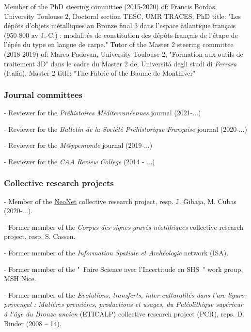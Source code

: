 \documentclass{article}
\begin{document}
Member of the PhD steering committee (2015-2020) of: Francis Bordas, University Toulouse 2, Doctoral section TESC, UMR TRACES, PhD title: "Les d\'{e}p\^{o}ts d'objets m\'{e}talliques au Bronze final 3 dans l'espace atlantique fran\c{c}ais (950-800 av J.-C.) : modalit\'{e}s de constitution des d\'{e}p\^{o}ts fran\c{c}ais de l'\'{e}tape de l'\'{e}p\'{e}e du type en langue de carpe."
\smallbreak
Tutor of the Master 2  steering committee (2018-2019) of: Marco Padovan, University Toulouse 2, "Formation aux outils de traitement 3D" dans le cadre du Master 2 de, Universit\'{a} degli studi di \textit{Ferrara} (Italia), Master 2 title: "The Fabric of the Baume de Monthiver"

\subsubsection*{Journal committees}

-  Reviewer for the \textit{Pr\'{e}histoires M\'{e}diterran\'{e}ennes} journal (2021-...)

-  Reviewer for the \textit{Bulletin de la Soci\'{e}t\'{e} Pr\'{e}historique Fran\c{c}aise} journal (2020-...)

-  Reviewer for the \textit{M@ppemonde} journal (2019-...)

-  Reviewer for the \textit{CAA Review College} (2014 - ...)

\subsubsection*{Collective research projects}

-  Member of the \href{https://redneonet.com/}{NeoNet} collective research project, resp. J. Gibaja, M. Cubas (2020-...).

-  Former member of the \textit{Corpus des signes grav\'{e}s n\'{e}olithiques} collective research project, resp. S. Cassen.

-  Former member of the \textit{Information Spatiale et Arch\'{e}ologie} network (ISA). 

-  Former member of the "~Faire Science avec l'Incertitude en SHS~" work group, MSH Nice.

-  Former member of the \textit{Evolutions, transferts, inter-culturalit\'{e}s dans l'arc liguro-proven\c{c}al : Mati\'{e}res premi\'{e}res, productions et usages, du Pal\'{e}olithique sup\'{e}rieur \'{a} l'\^{a}ge du Bronze ancien} (ETICALP) collective research project (PCR), reps. D. Binder (2008 -- 14).
\end{document}
